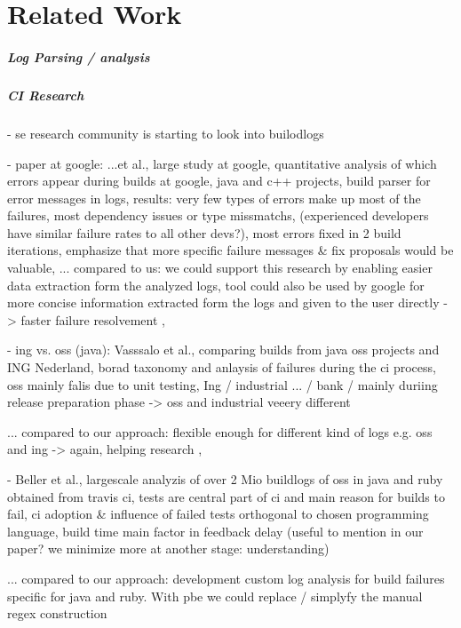 \documentclass[\myrootdir/main.tex]{subfiles}
\begin{document}
\chapter{Related Work}

\paragraph{Log Parsing / analysis}

\paragraph{CI Research}
- se research community is starting to look into builodlogs

- paper at google: ...et al., large study at google, quantitative analysis of which errors appear during builds at google, java and c++ projects, build parser for error messages in logs, results: very few types of errors make up most of the failures, most dependency issues or type missmatchs, (experienced developers have similar failure rates to all other devs?), most errors fixed in 2 build iterations, emphasize that more specific failure messages \& fix proposals would be valuable,
... compared to us: we could support this research by enabling easier data extraction form the analyzed logs, tool could also be used by google for more concise information extracted form the logs and given to the user directly -> faster failure resolvement \cite{seo2014programmers},

- ing vs. oss (java): Vasssalo et al., comparing builds from java oss projects and ING Nederland, borad taxonomy and anlaysis of failures during the ci process, oss mainly falis due to unit testing, Ing / industrial ... / bank / mainly duriing release preparation phase -> oss and industrial veeery different

... compared to our approach: flexible enough for different kind of logs e.g. oss and ing -> again, helping research \cite{vassallo2017a-tale}, 


- Beller et al., largescale analyzis of over 2 Mio buildlogs of oss in java and ruby obtained from travis ci, tests are central part of ci and main reason for builds to fail, ci adoption \& influence of failed tests orthogonal to chosen programming language, build time main factor in feedback delay (useful to mention in our paper? we minimize more at another stage: understanding)

... compared to our approach: development custom log analysis for build failures specific for java and ruby. With pbe we could replace / simplyfy the manual regex construction\ \cite{beller2017oops}
\end{document}
